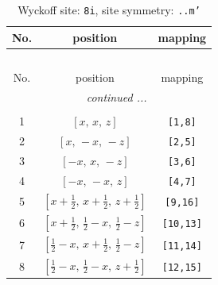 \documentclass[fleqn,8pt]{jsarticle}
\begin{document}
\begin{longtable}{ccc}
\caption{Wyckoff site: {\tt 8i}, site symmetry: {\tt ..m'}}
 \\
 \hline \hline
No. & position & mapping \\ \hline \endfirsthead

\multicolumn{2}{l}{\tablename\ \thetable{}} \\
 \hline \hline
No. & position & mapping \\ \hline \endhead

 \hline \hline
\multicolumn{2}{r}{\footnotesize\it continued ...} \\ \endfoot

 \hline \hline
\multicolumn{2}{r}{} \\ \endlastfoot

1 & $\left[ x,\, x,\, z \right]$ & {\tt [1,8]} \\ \hline
2 & $\left[ x,\, - x,\, - z \right]$ & {\tt [2,5]} \\ \hline
3 & $\left[ - x,\, x,\, - z \right]$ & {\tt [3,6]} \\ \hline
4 & $\left[ - x,\, - x,\, z \right]$ & {\tt [4,7]} \\ \hline
5 & $\left[ x + \frac{1}{2},\, x + \frac{1}{2},\, z + \frac{1}{2} \right]$ & {\tt [9,16]} \\ \hline
6 & $\left[ x + \frac{1}{2},\, \frac{1}{2} - x,\, \frac{1}{2} - z \right]$ & {\tt [10,13]} \\ \hline
7 & $\left[ \frac{1}{2} - x,\, x + \frac{1}{2},\, \frac{1}{2} - z \right]$ & {\tt [11,14]} \\ \hline
8 & $\left[ \frac{1}{2} - x,\, \frac{1}{2} - x,\, z + \frac{1}{2} \right]$ & {\tt [12,15]} \\
\end{longtable}
\renewcommand{\arraystretch}{1.2}
\end{document}
